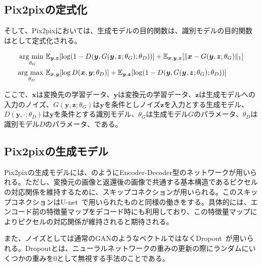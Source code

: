 \subsection{Pix2pixの定式化}

そして、Pix2pixにおいては、生成モデルの目的関数は、識別モデルの目的関数はとして定式化される。

\begin{align}
    \label{eq:pix2pix_G}
    \mathop{\mathrm{arg~min~}}\limits _{\theta_G}& \mathbb{E}_{\boldsymbol{y}, \boldsymbol{z}}[\log (1-D(\boldsymbol{y}, G(\boldsymbol{y}, \boldsymbol{z}; \theta_G); \theta_D))]+\mathbb{E}_{\boldsymbol{x}, \boldsymbol{y}, \boldsymbol{z}}[\|\boldsymbol{x}-G(\boldsymbol{y}, \boldsymbol{z}; \theta_G)\|_{1}]\\
    \label{eq:pix2pix_D}
    \mathop{\mathrm{arg~max~}}\limits _{\theta_D}& \mathbb{E}_{\boldsymbol{x}, \boldsymbol{y}}[\log D(\boldsymbol{x}, \boldsymbol{y}; \theta_D)]+\mathbb{E}_{\boldsymbol{y}, \boldsymbol{z}}[\log (1-D(\boldsymbol{y}, G(\boldsymbol{y}, \boldsymbol{z}; \theta_G); \theta_D))]
\end{align}

ここで、$\boldsymbol{x}$は変換先の学習データ、$\boldsymbol{y}$は変換元の学習データ、$\boldsymbol{z}$は生成モデルへの入力のノイズ、$G(\boldsymbol{y},\boldsymbol{z};\theta_G)$は$\boldsymbol{y}$を条件としノイズ$\boldsymbol{z}$を入力とする生成モデル、$D(\boldsymbol{y},\cdot;\theta_D)$は$\boldsymbol{y}$を条件とする識別モデル、$\theta_G$は生成モデル$G$のパラメータ、$\theta_D$は識別モデル$D$のパラメータ、である。

\subsection{Pix2pixの生成モデル}

Pix2pixの生成モデルには、のようにEncoder-Decoder型のネットワークが用いられる。ただし、変換元の画像と返還後の画像で共通する基本構造であるピクセルの対応関係を維持するために、スキップコネクションが用いられる。このスキップコネクションはU-net~\cite{u-net}で用いられたものと同様の働きをする。具体的には、エンコード前の特徴量マップをデコード時にも利用しており、この特徴量マップによりピクセルの対応関係が維持されると期待される。

また、ノイズとしては通常のGANのようなベクトルではなくDropout~\cite{Dropout}が用いられる。Dropoutとは、ニューラルネットワークの重みの更新の際にランダムにいくつかの重みを0として無視する手法のことである。

\clearpage


